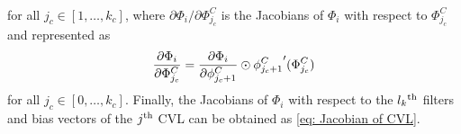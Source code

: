 \documentclass{l4dc2025}
\begin{document}
\begin{appendix}
\begin{equation}
\begin{aligned}
        \end{aligned}
\end{equation}
for all $j_c\in[1,\dots,k_c]$, where $\partial \Phi_i/\partial \Phi^C_{j_c}$ is the Jacobians of $\Phi_i$ with respect to $\Phi^C_{j_c}$ and represented as
\begin{equation}
    {\partial \Phi_i\over\partial {\Phi^C_{j_c}}} = {\partial {\Phi_i}\over\partial \phi^{C}_{j_c+1}}\odot{\phi^{C}_{j_c+1}}'({\Phi^C_{j_c}})
\end{equation}
for all $j_c\in[0,\dots,k_c]$.
Finally, the Jacobians of $\Phi_i$ with respect to the $l_k\textsuperscript{th}$ filters and bias vectors of the $j\textsuperscript{th}$ CVL can be obtained as \eqref{eq: Jacobian of CVL}.

\end{appendix}


% 
% 

\end{document}
